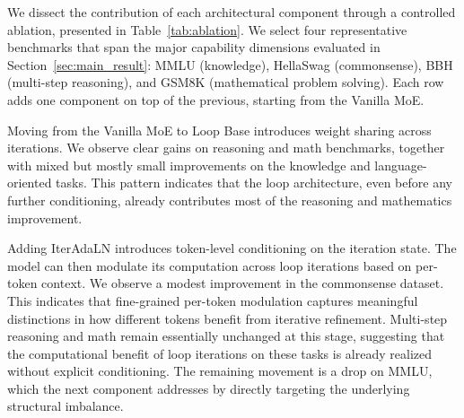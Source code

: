 \begin{table}[t]
\centering
{}
\caption{Ablation study on the core components of the proposed architecture.}
\label{tab:ablation}
\end{table}

We dissect the contribution of each architectural component through a controlled ablation, presented in Table~\ref{tab:ablation}. We select four representative benchmarks that span the major capability dimensions evaluated in Section~\ref{sec:main_result}: MMLU (knowledge), HellaSwag (commonsense), BBH (multi-step reasoning), and GSM8K (mathematical problem solving). Each row adds one component on top of the previous, starting from the Vanilla MoE.

Moving from the Vanilla MoE to Loop Base introduces weight sharing across iterations. We observe clear gains on reasoning and math benchmarks, together with mixed but mostly small improvements on the knowledge and language-oriented tasks. This pattern indicates that the loop architecture, even before any further conditioning, already contributes most of the reasoning and mathematics improvement.

Adding IterAdaLN introduces token-level conditioning on the iteration state. The model can then modulate its computation across loop iterations based on per-token context. We observe a modest improvement in the commonsense dataset. This indicates that fine-grained per-token modulation captures meaningful distinctions in how different tokens benefit from iterative refinement. Multi-step reasoning and math remain essentially unchanged at this stage, suggesting that the computational benefit of loop iterations on these tasks is already realized without explicit conditioning. The remaining movement is a drop on MMLU, which the next component addresses by directly targeting the underlying structural imbalance.


